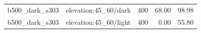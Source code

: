 \begin{longtable}{l>{\raggedright\arraybackslash}p{.42\linewidth}rrr}
b500\_\allowbreak{}dark\_\allowbreak{}s303 & %
elevation:45\_\allowbreak{}60/dark & %
400 & %
68.00 & %
98.98 \\ %

b500\_\allowbreak{}dark\_\allowbreak{}s303 & %
elevation:45\_\allowbreak{}60/light & %
400 & %
0.00 & %
55.80 \\ %


\end{longtable}
